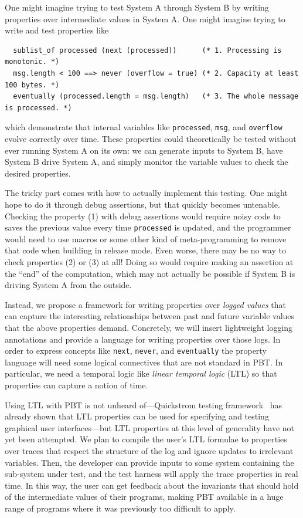 One might imagine trying to test System A through System B by writing properties
over intermediate values in System A. One might imagine trying to write and
test properties like
\begin{lstlisting}
  sublist_of processed (next (processed))      (* 1. Processing is monotonic. *)
  msg.length < 100 ==> never (overflow = true) (* 2. Capacity at least 100 bytes. *)
  eventually (processed.length = msg.length)   (* 3. The whole message is processed. *)
\end{lstlisting}
which demonstrate that internal variables like \lstinline{processed},
\lstinline{msg}, and \lstinline{overflow} evolve correctly over time.
These properties could theoretically be tested without ever running System A on
its own: we can generate inputs to System B, have System B drive System A, and
simply monitor the variable values to check the desired properties.

The tricky part comes with how to actually implement this testing. One might
hope to do it through debug assertions, but that quickly becomes untenable.
Checking the property (1) with debug assertions would require noisy code to
saves the previous value every time \lstinline{processed} is updated, and the
programmer would need to use macros or some other kind of meta-programming to
remove that code when building in release mode. Even worse, there may be no way
to check properties (2) or (3) at all! Doing so would require making an
assertion at the ``end'' of the computation, which may not actually be possible
if System B is driving System A from the outside.

Instead, we propose a framework for writing properties over {\em logged values}
that can capture the interesting relationships between past and future variable
values that the above properties demand.  Concretely, we will insert lightweight
logging annotations and provide a language for writing properties over those
logs. In order to express concepts like \lstinline{next}, \lstinline{never}, and
\lstinline{eventually} the property language will need some logical connectives
that are not standard in PBT.  In particular, we need a temporal logic like {\em
linear temporal logic} (LTL) so that properties can capture a notion of time.

Using LTL with PBT is not unheard of---Quickstrom testing
framework~\cite{oconnor_quickstrom_2022} has already shown that LTL properties
can be used for specifying and testing graphical user interfaces---but LTL
properties at this level of generality have not yet been attempted. We plan to
compile the user's LTL formulae to properties over traces that respect the
structure of the log and ignore updates to irrelevant variables. Then, the
developer can provide inputs to some system containing the sub-system under
test, and the test harness will apply the trace properties in real time. In this
way, the user can get feedback about the invariants that should hold of the
intermediate values of their programs, making PBT available in a huge range of
programs where it was previously too difficult to apply.

